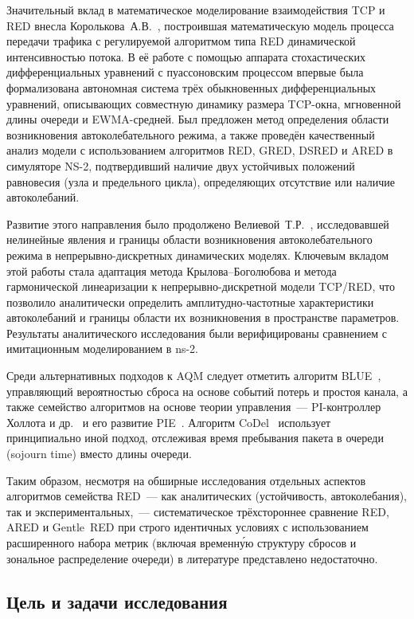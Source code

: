 \documentclass[12pt,a4paper]{article}
\begin{document}
Значительный вклад в математическое моделирование взаимодействия TCP и RED внесла Королькова~А.В.~\cite{korolkova2010}, построившая математическую модель процесса передачи трафика с регулируемой алгоритмом типа RED динамической интенсивностью потока. В её работе с помощью аппарата стохастических дифференциальных уравнений с пуассоновским процессом впервые была формализована автономная система трёх обыкновенных дифференциальных уравнений, описывающих совместную динамику размера TCP-окна, мгновенной длины очереди и EWMA-средней. Был предложен метод определения области возникновения автоколебательного режима, а также проведён качественный анализ модели с использованием алгоритмов RED, GRED, DSRED и ARED в симуляторе NS-2, подтвердивший наличие двух устойчивых положений равновесия (узла и предельного цикла), определяющих отсутствие или наличие автоколебаний.

Развитие этого направления было продолжено Велиевой~Т.Р.~\cite{velieva2019}, исследовавшей нелинейные явления и границы области возникновения автоколебательного режима в непрерывно-дискретных динамических моделях. Ключевым вкладом этой работы стала адаптация метода Крылова--Боголюбова и метода гармонической линеаризации к непрерывно-дискретной модели TCP/RED, что позволило аналитически определить амплитудно-частотные характеристики автоколебаний и границы области их возникновения в пространстве параметров. Результаты аналитического исследования были верифицированы сравнением с имитационным моделированием в ns-2.

Среди альтернативных подходов к AQM следует отметить алгоритм BLUE~\cite{feng2002}, управляющий вероятностью сброса на основе событий потерь и простоя канала, а также семейство алгоритмов на основе теории управления~--- PI-контроллер Холлота и др.~\cite{hollot2001} и его развитие PIE~\cite{pan2013}. Алгоритм CoDel~\cite{nichols2012} использует принципиально иной подход, отслеживая время пребывания пакета в очереди (sojourn time) вместо длины очереди.

Таким образом, несмотря на обширные исследования отдельных аспектов алгоритмов семейства RED~--- как аналитических (устойчивость, автоколебания), так и экспериментальных,~--- систематическое трёхстороннее сравнение RED, ARED и Gentle~RED при строго идентичных условиях с использованием расширенного набора метрик (включая временн\'{у}ю структуру сбросов и зональное распределение очереди) в литературе представлено недостаточно.

\subsection{Цель и задачи исследования}
\end{document}

